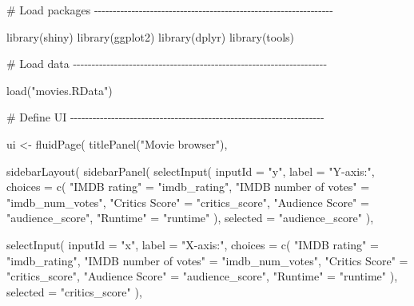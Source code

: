 \documentclass[
  letterpaper,
  DIV=11,
  numbers=noendperiod]{scrreprt}
\newenvironment{Shaded}{\begin{snugshade}}{\end{snugshade}}
\newcommand{\AttributeTok}[1]{\textcolor[rgb]{0.40,0.46,0.14}{#1}}
\newcommand{\CommentTok}[1]{\textcolor[rgb]{0.37,0.37,0.37}{#1}}
\newcommand{\FunctionTok}[1]{\textcolor[rgb]{0.28,0.35,0.67}{#1}}
\newcommand{\NormalTok}[1]{\textcolor[rgb]{0.00,0.46,0.62}{#1}}
\newcommand{\OtherTok}[1]{\textcolor[rgb]{0.00,0.46,0.62}{#1}}
\newcommand{\StringTok}[1]{\textcolor[rgb]{0.13,0.47,0.30}{#1}}
\begin{document}
\begin{Shaded}
\begin{Highlighting}[]
\CommentTok{\# Load packages {-}{-}{-}{-}{-}{-}{-}{-}{-}{-}{-}{-}{-}{-}{-}{-}{-}{-}{-}{-}{-}{-}{-}{-}{-}{-}{-}{-}{-}{-}{-}{-}{-}{-}{-}{-}{-}{-}{-}{-}{-}{-}{-}{-}{-}{-}{-}{-}{-}{-}{-}{-}{-}{-}{-}{-}{-}{-}{-}{-}{-}{-}{-}{-}}

\FunctionTok{library}\NormalTok{(shiny)}
\FunctionTok{library}\NormalTok{(ggplot2)}
\FunctionTok{library}\NormalTok{(dplyr)}
\FunctionTok{library}\NormalTok{(tools)}

\CommentTok{\# Load data {-}{-}{-}{-}{-}{-}{-}{-}{-}{-}{-}{-}{-}{-}{-}{-}{-}{-}{-}{-}{-}{-}{-}{-}{-}{-}{-}{-}{-}{-}{-}{-}{-}{-}{-}{-}{-}{-}{-}{-}{-}{-}{-}{-}{-}{-}{-}{-}{-}{-}{-}{-}{-}{-}{-}{-}{-}{-}{-}{-}{-}{-}{-}{-}{-}{-}{-}{-}}

\FunctionTok{load}\NormalTok{(}\StringTok{"movies.RData"}\NormalTok{)}

\CommentTok{\# Define UI {-}{-}{-}{-}{-}{-}{-}{-}{-}{-}{-}{-}{-}{-}{-}{-}{-}{-}{-}{-}{-}{-}{-}{-}{-}{-}{-}{-}{-}{-}{-}{-}{-}{-}{-}{-}{-}{-}{-}{-}{-}{-}{-}{-}{-}{-}{-}{-}{-}{-}{-}{-}{-}{-}{-}{-}{-}{-}{-}{-}{-}{-}{-}{-}{-}{-}{-}{-}}

\NormalTok{ui }\OtherTok{\textless{}{-}} \FunctionTok{fluidPage}\NormalTok{(}
  \FunctionTok{titlePanel}\NormalTok{(}\StringTok{"Movie browser"}\NormalTok{),}

  \FunctionTok{sidebarLayout}\NormalTok{(}
    \FunctionTok{sidebarPanel}\NormalTok{(}
      \FunctionTok{selectInput}\NormalTok{(}
        \AttributeTok{inputId =} \StringTok{"y"}\NormalTok{,}
        \AttributeTok{label =} \StringTok{"Y{-}axis:"}\NormalTok{,}
        \AttributeTok{choices =} \FunctionTok{c}\NormalTok{(}
          \StringTok{"IMDB rating"} \OtherTok{=} \StringTok{"imdb\_rating"}\NormalTok{,}
          \StringTok{"IMDB number of votes"} \OtherTok{=} \StringTok{"imdb\_num\_votes"}\NormalTok{,}
          \StringTok{"Critics Score"} \OtherTok{=} \StringTok{"critics\_score"}\NormalTok{,}
          \StringTok{"Audience Score"} \OtherTok{=} \StringTok{"audience\_score"}\NormalTok{,}
          \StringTok{"Runtime"} \OtherTok{=} \StringTok{"runtime"}
\NormalTok{        ),}
        \AttributeTok{selected =} \StringTok{"audience\_score"}
\NormalTok{      ),}

      \FunctionTok{selectInput}\NormalTok{(}
        \AttributeTok{inputId =} \StringTok{"x"}\NormalTok{,}
        \AttributeTok{label =} \StringTok{"X{-}axis:"}\NormalTok{,}
        \AttributeTok{choices =} \FunctionTok{c}\NormalTok{(}
          \StringTok{"IMDB rating"} \OtherTok{=} \StringTok{"imdb\_rating"}\NormalTok{,}
          \StringTok{"IMDB number of votes"} \OtherTok{=} \StringTok{"imdb\_num\_votes"}\NormalTok{,}
          \StringTok{"Critics Score"} \OtherTok{=} \StringTok{"critics\_score"}\NormalTok{,}
          \StringTok{"Audience Score"} \OtherTok{=} \StringTok{"audience\_score"}\NormalTok{,}
          \StringTok{"Runtime"} \OtherTok{=} \StringTok{"runtime"}
\NormalTok{        ),}
        \AttributeTok{selected =} \StringTok{"critics\_score"}
\NormalTok{      ),}


\end{Highlighting}
\end{Shaded}
\end{document}
